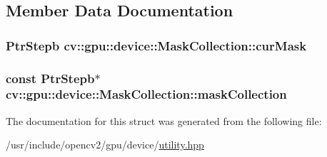 \subsection{Member Data Documentation}
\hypertarget{structcv_1_1gpu_1_1device_1_1MaskCollection_a14ec0d2979261188a2214da2582d1560}{
\subsubsection[{cur\-Mask}]{\setlength{\rightskip}{0pt plus 5cm}Ptr\-Stepb cv\-::gpu\-::device\-::\-Mask\-Collection\-::cur\-Mask}}\label{structcv_1_1gpu_1_1device_1_1MaskCollection_a14ec0d2979261188a2214da2582d1560}
\hypertarget{structcv_1_1gpu_1_1device_1_1MaskCollection_a1eb17aec83f21018c46f5baa0c57350f}{
\subsubsection[{mask\-Collection}]{\setlength{\rightskip}{0pt plus 5cm}const Ptr\-Stepb$\ast$ cv\-::gpu\-::device\-::\-Mask\-Collection\-::mask\-Collection}}\label{structcv_1_1gpu_1_1device_1_1MaskCollection_a1eb17aec83f21018c46f5baa0c57350f}


The documentation for this struct was generated from the following file\-:\begin{DoxyCompactItemize}
\item 
/usr/include/opencv2/gpu/device/\hyperlink{utility_8hpp}{utility.\-hpp}\end{DoxyCompactItemize}
